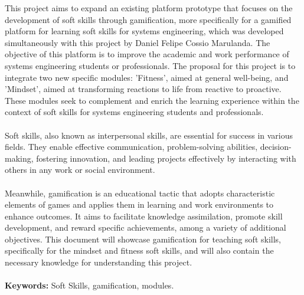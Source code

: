 This project aims to expand an existing platform prototype that focuses on the development of soft skills through gamification, more specifically for a gamified platform for learning soft skills for systems engineering, which was developed simultaneously with this project by Daniel Felipe Cossio Marulanda. The objective of this platform is to improve the academic and work performance of systems engineering students or professionals. The proposal for this project is to integrate two new specific modules: 'Fitness', aimed at general well-being, and 'Mindset', aimed at transforming reactions to life from reactive to proactive. These modules seek to complement and enrich the learning experience within the context of soft skills for systems engineering students and professionals.
\\ \\
Soft skills, also known as interpersonal skills, are essential for success in various fields. They enable effective communication, problem-solving abilities, decision-making, fostering innovation, and leading projects effectively by interacting with others in any work or social environment.
\\ \\
Meanwhile, gamification is an educational tactic that adopts characteristic elements of games and applies them in learning and work environments to enhance outcomes. It aims to facilitate knowledge assimilation, promote skill development, and reward specific achievements, among a variety of additional objectives. This document will showcase gamification for teaching soft skills, specifically for the mindset and fitness soft skills, and will also contain the necessary knowledge for understanding this project.
\\ \\
\textbf{Keywords:} Soft Skills, gamification, modules.


